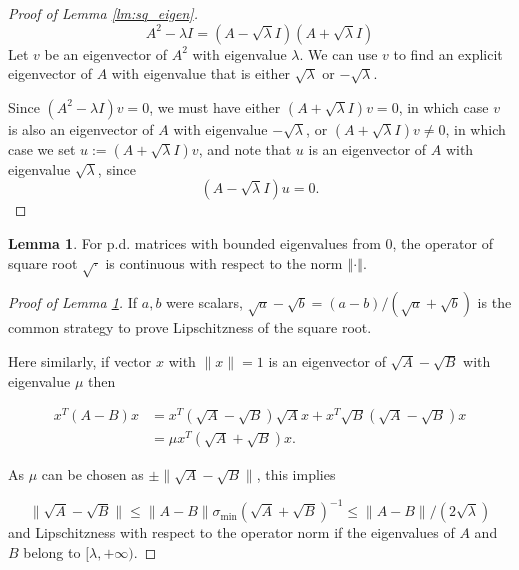 ﻿\documentclass[12pt]{article}
\newcommand{\0}{\mbox{\bf 0}}
\theoremstyle{plain}%
\newtheorem{lemma}[theorem]{Lemma}
\theoremstyle{definition}
\newtheorem{lemma}[theorem]{Lemma}
\begin{document}
{\begin{proof}[Proof of Lemma \protect\ref{lm:sq_eigen}]
\begin{equation*}
A^2-\lambda I=(A-\sqrt{\lambda} I)(A+\sqrt{\lambda} I)
\end{equation*}
Let $v$ be an eigenvector of $A^2$ with eigenvalue $\lambda$. We can use $v$
to find an explicit eigenvector of $A$ with eigenvalue that is either $\sqrt{
\lambda}$ or $-\sqrt{\lambda}$.

Since $\left( A^{2}-\lambda I\right) v=0$, we must have either $(A+\sqrt{
\lambda }I)v=0$, in which case $v$ is also an eigenvector of $A$ with
eigenvalue $-\sqrt{\lambda }$, or $(A+\sqrt{\lambda }I)v\neq 0$, in which
case we set $u:=(A+\sqrt{\lambda }I)v$, and note that $u$ is an eigenvector
of $A$ with eigenvalue $\sqrt{\lambda }$, since 
\begin{equation*}
(A-\sqrt{\lambda }I)u=0.
\end{equation*}
\end{proof}

\begin{lemma}
\label{lm:sqrt_cont} For p.d. matrices with bounded eigenvalues from 0, the
operator of square root $\sqrt{\cdot }$ is continuous with respect to the
norm $\left\Vert \cdot \right\Vert $.
\end{lemma}

\begin{proof}[Proof of Lemma \protect\ref{lm:sqrt_cont}]
If $a, b$ were scalars, $\sqrt{a}-\sqrt{ b}=(a-b) /(\sqrt{a}+\sqrt{b})$ is
the common strategy to prove Lipschitzness of the square root.

Here similarly, if vector $x$ with $\|x\|=1$ is an eigenvector of $\sqrt{A}- 
\sqrt{B}$ with eigenvalue $\mu$ then

\begin{equation*}
\begin{aligned} x^T(A-B) x & =x^T(\sqrt{A}-\sqrt{B}) \sqrt{A} x+x^T
\sqrt{B}(\sqrt{A}-\sqrt{B}) x \\ & =\mu x^T(\sqrt{A}+\sqrt{B}) x .
\end{aligned}
\end{equation*}

As $\mu$ can be chosen as $\pm\|\sqrt{A}-\sqrt{B}\|$, this implies

\begin{equation*}
\|\sqrt{A}-\sqrt{B}\| \leq\|A-B\| \sigma_{\min }(\sqrt{A}+\sqrt{ B})^{-1}
\leq\|A-B\| /(2 \sqrt{\lambda})
\end{equation*}
and Lipschitzness with respect to the operator norm if the eigenvalues of $A$
and $B$ belong to $[\lambda ,+\infty ).$
\end{proof}

}
\end{document}
